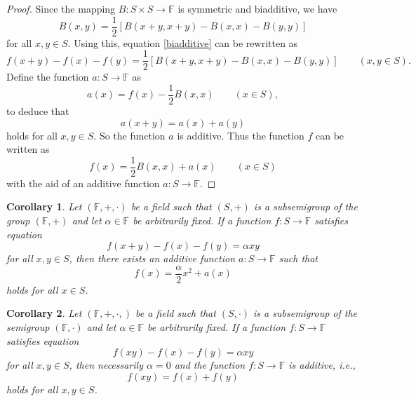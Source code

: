 \documentclass[a4paper,12pt]{article}
\theoremstyle{plain}
\newtheorem{cor}{Corollary}
\theoremstyle{definition}
\theoremstyle{remark}
\begin{document}
\begin{proof}
 Since the mapping $B\colon S\times S\to \mathbb{F}$ is symmetric and biadditive, we have 
 \[
  B(x, y)= \frac{1}{2}\left[B(x+y, x+y)-B(x, x)-B(y, y)\right]
 \]
for all $x, y\in S$. Using this, equation \eqref{biadditive} can be rewritten as 
\[
 f(x+y)-f(x)-f(y)= \frac{1}{2}\left[B(x+y, x+y)-B(x, x)-B(y, y)\right] 
 \qquad 
 \left(x, y\in S\right). 
\]
Define the function $a\colon S\to \mathbb{F}$ as 
\[
 a(x)= f(x)-\frac{1}{2}B(x, x) 
 \qquad 
 \left(x\in S\right), 
\]
to deduce that 
\[
 a(x+y)=a(x)+a(y)
\]
holds for all $x, y\in S$. So the function $a$ is additive. Thus the function $f$ can be written as 
\[
 f(x)= \frac{1}{2}B(x, x)+a(x) 
 \qquad 
 \left(x\in S\right)
\]
with the aid of an additive function $a\colon S\to \mathbb{F}$. 
\end{proof}





\begin{cor}\label{cor1}
 Let $(\mathbb{F},+, \cdot)$ be a field such that 
 $(S, +)$ is a subsemigroup of the group $(\mathbb{F}, +)$ and let $\alpha \in \mathbb{F}$ be arbitrarily fixed. If a function $f\colon S\to \mathbb{F}$ satisfies equation 
 \begin{equation}\label{additive_difference}
  f(x+y)-f(x)-f(y)= \alpha xy
 \end{equation}
for all $x, y\in S$, then there exists an additive function $a\colon S\to \mathbb{F}$ such that 
\[
 f(x)= \frac{\alpha}{2}x^{2}+a(x)
\]
holds for all $x\in S$. 
\end{cor}


\begin{cor}\label{lem_exp_difference}
 Let $(\mathbb{F},+, \cdot, )$ be a field such that 
 $(S, \cdot)$ is a subsemigroup of the semigroup $(\mathbb{F}, \cdot)$ and let $\alpha \in \mathbb{F}$ be arbitrarily fixed. If a function $f\colon S\to \mathbb{F}$ satisfies equation 
 \begin{equation}\label{exp_difference}
  f(xy)-f(x)-f(y)= \alpha xy
 \end{equation}
for all $x, y\in S$, then necessarily $\alpha=0$ and the function $f\colon S\to \mathbb{F}$ is additive, i.e., 
\[
 f(x y)= f(x)+f(y)
\]
holds for all $x, y\in S$. 
\end{cor}
\end{document}
